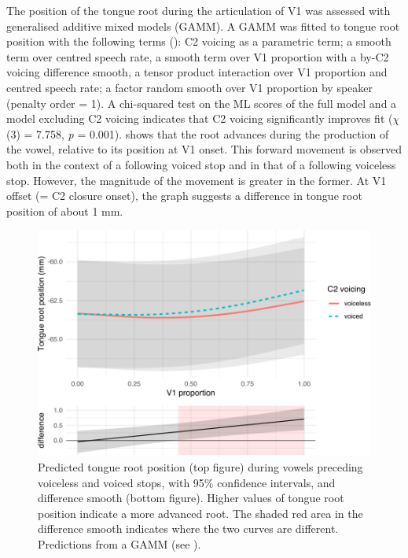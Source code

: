 \documentclass[
  12pt,
]{article}
\begin{document}
\label{s:trp-v1}

The position of the tongue root during the articulation of V1 was
assessed with generalised additive mixed models (GAMM). A GAMM was
fitted to tongue root position with the following terms
(): C2 voicing as a parametric term; a smooth
term over centred speech rate, a smooth term over V1 proportion with a
by-C2 voicing difference smooth, a tensor product interaction over V1
proportion and centred speech rate; a factor random smooth over V1
proportion by speaker (penalty order = 1). A chi-squared test on the ML
scores of the full model and a model excluding C2 voicing indicates that
C2 voicing significantly improves fit (\(\chi\)(3) = 7.758, \emph{p} =
0.001).  shows that the root advances during the
production of the vowel, relative to its position at V1 onset. This
forward movement is observed both in the context of a following voiced
stop and in that of a following voiceless stop. However, the magnitude
of the movement is greater in the former. At V1 offset (= C2 closure
onset), the graph suggests a difference in tongue root position of about
1 mm.

\begin{figure}
\includegraphics[width=\linewidth]{2018-tra_files/figure-latex/tra-gam-plot-1} \caption{Predicted tongue root position (top figure) during vowels preceding voiceless and voiced stops, with 95\% confidence intervals, and difference smooth (bottom figure). Higher values of tongue root position indicate a more advanced root. The shaded red area in the difference smooth indicates where the two curves are different. Predictions from a GAMM (see ).}\label{f:tra-gam-plot}
\end{figure}
\end{document}

